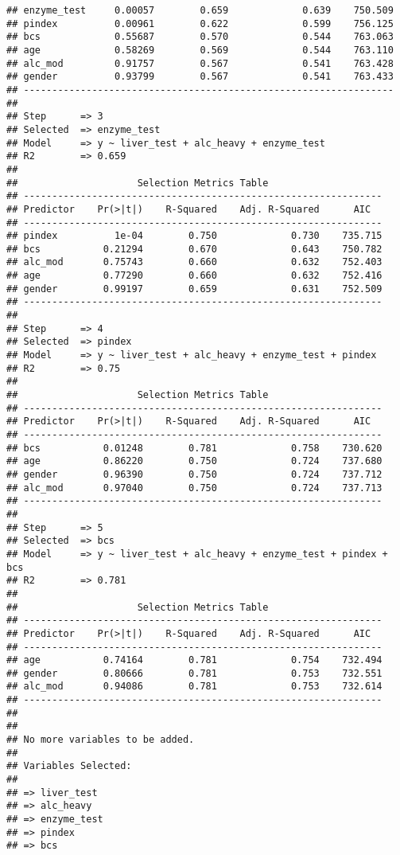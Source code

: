 \documentclass[
]{article}
\begin{document}
\begin{verbatim}
## enzyme_test     0.00057        0.659             0.639    750.509 
## pindex          0.00961        0.622             0.599    756.125 
## bcs             0.55687        0.570             0.544    763.063 
## age             0.58269        0.569             0.544    763.110 
## alc_mod         0.91757        0.567             0.541    763.428 
## gender          0.93799        0.567             0.541    763.433 
## -----------------------------------------------------------------
## 
## Step      => 3 
## Selected  => enzyme_test 
## Model     => y ~ liver_test + alc_heavy + enzyme_test 
## R2        => 0.659 
## 
##                     Selection Metrics Table                     
## ---------------------------------------------------------------
## Predictor    Pr(>|t|)    R-Squared    Adj. R-Squared      AIC   
## ---------------------------------------------------------------
## pindex          1e-04        0.750             0.730    735.715 
## bcs           0.21294        0.670             0.643    750.782 
## alc_mod       0.75743        0.660             0.632    752.403 
## age           0.77290        0.660             0.632    752.416 
## gender        0.99197        0.659             0.631    752.509 
## ---------------------------------------------------------------
## 
## Step      => 4 
## Selected  => pindex 
## Model     => y ~ liver_test + alc_heavy + enzyme_test + pindex 
## R2        => 0.75 
## 
##                     Selection Metrics Table                     
## ---------------------------------------------------------------
## Predictor    Pr(>|t|)    R-Squared    Adj. R-Squared      AIC   
## ---------------------------------------------------------------
## bcs           0.01248        0.781             0.758    730.620 
## age           0.86220        0.750             0.724    737.680 
## gender        0.96390        0.750             0.724    737.712 
## alc_mod       0.97040        0.750             0.724    737.713 
## ---------------------------------------------------------------
## 
## Step      => 5 
## Selected  => bcs 
## Model     => y ~ liver_test + alc_heavy + enzyme_test + pindex + bcs 
## R2        => 0.781 
## 
##                     Selection Metrics Table                     
## ---------------------------------------------------------------
## Predictor    Pr(>|t|)    R-Squared    Adj. R-Squared      AIC   
## ---------------------------------------------------------------
## age           0.74164        0.781             0.754    732.494 
## gender        0.80666        0.781             0.753    732.551 
## alc_mod       0.94086        0.781             0.753    732.614 
## ---------------------------------------------------------------
## 
## 
## No more variables to be added.
## 
## Variables Selected: 
## 
## => liver_test 
## => alc_heavy 
## => enzyme_test 
## => pindex 
## => bcs
\end{verbatim}
\end{document}
